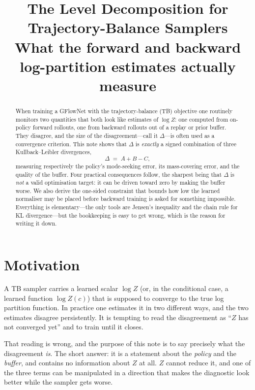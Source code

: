 \documentclass[11pt]{article}
\title{\textbf{The Level Decomposition for Trajectory-Balance Samplers}\\[0.4em]
\large What the forward and backward log-partition estimates actually measure}
\author{}
\date{}
\theoremstyle{plain}
\theoremstyle{definition}
\theoremstyle{remark}
\begin{document}
\maketitle
\vspace{-3.5em}

\begin{abstract}
\noindent
When training a GFlowNet with the trajectory-balance (TB) objective one routinely
monitors two quantities that both look like estimates of $\log Z$: one computed
from on-policy forward rollouts, one from backward rollouts out of a replay or
prior buffer. They disagree, and the size of the disagreement---call it
$\Delta$---is often used as a convergence criterion. This note shows that
$\Delta$ is \emph{exactly} a signed combination of three Kullback--Leibler
divergences,
\[
  \Delta \;=\; A + B - C,
\]
measuring respectively the policy's mode-seeking error, its mass-covering error,
and the quality of the buffer. Four practical consequences follow, the sharpest
being that $\Delta$ is \emph{not} a valid optimisation target: it can be driven
toward zero by making the buffer worse. We also derive the one-sided constraint
that bounds how low the learned normaliser may be placed before backward
training is asked for something impossible. Everything is elementary---the only
tools are Jensen's inequality and the chain rule for KL divergence---but the
bookkeeping is easy to get wrong, which is the reason for writing it down.
\end{abstract}

\section{Motivation}

A TB sampler carries a learned scalar $\log Z$ (or, in the conditional case, a
learned function $\log Z(c)$) that is supposed to converge to the true log
partition function. In practice one estimates it in two different ways, and the
two estimates disagree persistently. It is tempting to read the disagreement as
``$Z$ has not converged yet'' and to train until it closes.

That reading is wrong, and the purpose of this note is to say precisely what the
disagreement \emph{is}. The short answer: it is a statement about the
\emph{policy} and the \emph{buffer}, and contains no information about $Z$ at
all. $Z$ cannot reduce it, and one of the three terms can be manipulated in a
direction that makes the diagnostic look better while the sampler gets worse.
\end{document}
